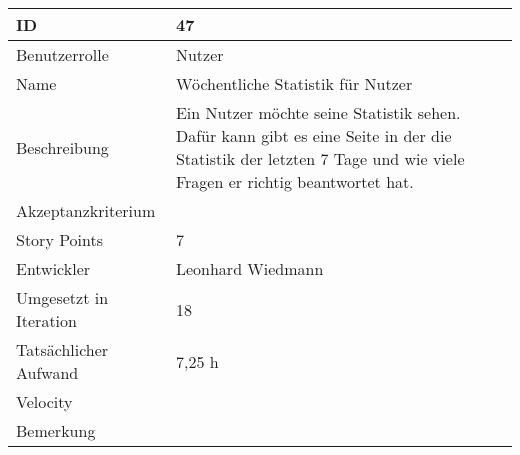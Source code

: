 \begin{tabularx}{\textwidth}{|p{}|X|}
	\hline
	ID & 47\\
	\hline
	Benutzerrolle & Nutzer\\
	\hline
	Name & Wöchentliche Statistik für Nutzer\\
	\hline
	Beschreibung & Ein Nutzer möchte seine Statistik sehen. Dafür kann gibt es eine Seite in der die Statistik der letzten 7 Tage und wie viele Fragen er richtig beantwortet hat.\\
	\hline
	Akzeptanzkriterium & \\
	\hline
	Story Points & 7\\
	\hline
	Entwickler & Leonhard Wiedmann \\
	\hline
	Umgesetzt in Iteration & 18\\
	\hline
	Tatsächlicher Aufwand & 7,25 h\\
	\hline
	Velocity & \\
	\hline
	Bemerkung & \\
	\hline
\end{tabularx}
\vspace{20pt}
